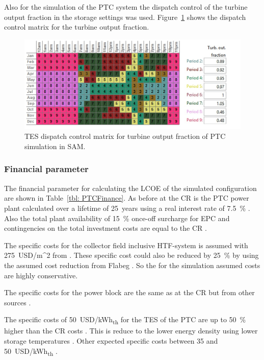 Also for the simulation of the PTC system the dispatch control of the turbine output fraction in the storage settings was used. Figure~\ref{PTC_turbineoutput} shows the dispatch control matrix for the turbine output fraction.
\begin{figure}[htbp]  
\centering
\includegraphics[width=0.95\linewidth]{FIG/PTC_turbineoutput}
\caption[TES dispatch control matrix for turbine output fraction of PTC simulation in SAM.]{TES dispatch control matrix for turbine output fraction of PTC simulation in SAM.}\label{PTC_turbineoutput}
\end{figure}
\subsubsection{Financial parameter}
The financial parameter for calculating the LCOE of the simulated configuration are shown in Table~\ref{tbl: PTCFinance}. As before at the CR is the PTC power plant calculated over a lifetime of \SI{25}{years} using a real interest rate of 7.5~\% \cite{FraunhoferISE2013}. Also the total plant availability of  15~\% once-off surcharge for EPC and contingencies on the total investment costs are equal to the CR \cite{Platzer2014}.


The specific costs for the collector field inclusive HTF-system is assumed with \SI{275}{USD/m}^2 from \cite{Morin2012}. These specific cost could also be reduced by 25~\% by using the assumed cost reduction from Flabeg \cite{FLABEG_FE_GmbH2015}. So the for the simulation assumed costs are highly conservative.

The specific costs for the power block are the same as at the CR but from other sources \cite{Platzer2014}. 

The specific costs of \SI{50}{USD/kWh}\textsubscript{th} for the TES of the PTC are up to 50~\% higher than the CR costs \cite{Platzer2014}. This is reduce to the lower energy density using lower storage temperatures \cite{Steinmann2015}. Other expected specific costs between 35 and \SI{50}{USD/kWh}\textsubscript{th} \cite{Steinmann2012}.

